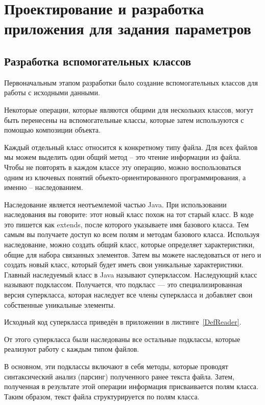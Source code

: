 
\section{Проектирование и разработка приложения для задания параметров}

\subsection{Разработка вспомогательных классов}

Первоначальным этапом разработки было создание вспомогательных классов для работы с исходными данными.

Некоторые операции, которые являются общими для нескольких классов, могут быть перенесены на вспомогательные классы, которые затем используются с помощью композиции объекта. 

Каждый отдельный класс относится к конкретному типу файла. Для всех файлов мы можем выделить один общий метод – это чтение информации из файла. Чтобы не повторять в каждом классе эту операцию, можно воспользоваться одним из ключевых понятий объекто-ориентированного программирования, а именно – наследованием. 

Наследование является неотъемлемой частью Java. При использовании наследования вы говорите: этот новый класс похож на тот старый класс. В коде это пишется как extends, после которого указываете имя базового класса. Тем самым вы получаете доступ ко всем полям и методам базового класса. Используя наследование, можно создать общий класс, которые определяет характеристики, общие для набора связанных элементов. Затем вы можете наследоваться от него и создать новый класс, который будет иметь свои уникальные характеристики. Главный наследуемый класс в Java называют суперклассом. Наследующий класс называют подклассом. Получается, что подкласс — это специализированная версия суперкласса, которая наследует все члены суперкласса и добавляет свои собственные уникальные элементы.

Исходный код суперкласса приведён в приложении в листинге~\ref{DefReader}.

От этого суперкласса были наследованы все остальные подклассы, которые реализуют работу с каждым типом файлов. 

В основном, эти подклассы включают в себя методы, которые проводят синтаксический анализ (парсинг) полученного ранее текста файла. Затем, полученная в результате этой операции информация присваивается полям класса. Таким образом, текст файла структурируется по полям класса. 

